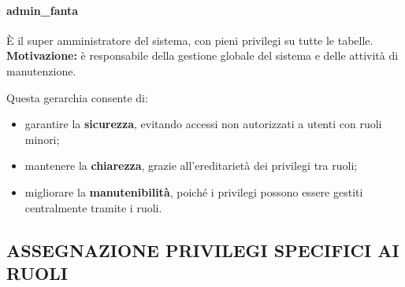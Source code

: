 \documentclass[a4paper]{article}
\begin{document}
\paragraph{admin\_fanta} È il super amministratore del sistema, con pieni privilegi su tutte le tabelle.\\
\textbf{Motivazione:} è responsabile della gestione globale del sistema e delle attività di manutenzione.

\medskip

\noindent
Questa gerarchia consente di:
\begin{itemize}
	\item garantire la \textbf{sicurezza}, evitando accessi non autorizzati a utenti con ruoli minori;
	\item mantenere la \textbf{chiarezza}, grazie all'ereditarietà dei privilegi tra ruoli;
	\item migliorare la \textbf{manutenibilità}, poiché i privilegi possono essere gestiti centralmente tramite i ruoli.
\end{itemize}




\subsection{ASSEGNAZIONE PRIVILEGI SPECIFICI AI RUOLI}
\end{document}
